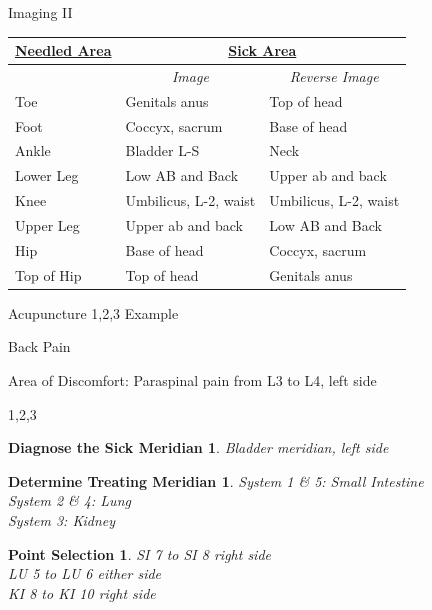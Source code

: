 \begin{frame}{Imaging II}
  \begin{table}[]
    \begin{tabular}{l|ll}
      {\ul \textbf{Needled Area}} & \multicolumn{2}{c}{{\ul \textbf{Sick Area}}}                                    \\ \hline
      & \multicolumn{1}{c}{\textit{Image}} & \multicolumn{1}{c}{\textit{Reverse Image}} \\
      Toe                         & Genitals anus                      & Top of head                                \\
      Foot                        & Coccyx, sacrum                     & Base of head                               \\
      Ankle                       & Bladder L-S                        & Neck                                       \\
      Lower Leg                   & Low AB and Back                    & Upper ab and back                          \\
      Knee                        & Umbilicus, L-2, waist              & Umbilicus, L-2, waist                      \\
      Upper Leg                   & Upper ab and back                  & Low AB and Back                            \\
      Hip                         & Base of head                       & Coccyx, sacrum                             \\
      Top of Hip                  & Top of head                        & Genitals anus                             
    \end{tabular}
  \end{table}
\end{frame}

\begin{frame}{Acupuncture 1,2,3 Example}
  \newtheorem{s1}{Diagnose the Sick Meridian}
  \newtheorem{s2}{Determine Treating Meridian}
  \newtheorem{s3}{Point Selection}
  \LARGE{Back Pain}

  Area of Discomfort: Paraspinal pain from L3 to L4, left side
\end{frame}
\begin{frame}{1,2,3}
  \begin{s1}
    Bladder meridian, left side
  \end{s1}

  \begin{s2}
    System 1 \& 5: Small Intestine\\
    System 2 \& 4: Lung\\
    System 3: Kidney
  \end{s2}

  \begin{s3}
    SI 7 to SI 8 right side \\
    LU 5 to LU 6 either side \\
    KI 8 to KI 10 right side \\
  \end{s3}
\end{frame}


